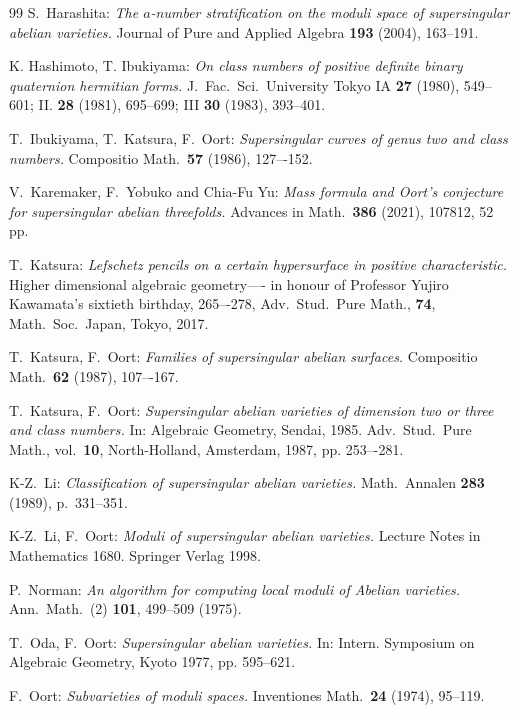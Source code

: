 \begin{thebibliography}{99}
 S.\ Harashita:
{\sl The $a$-number stratification on the moduli space of 
supersingular abelian varieties.} 
Journal of Pure and Applied Algebra \textbf{193} (2004), 163--191.

 K. Hashimoto, T. Ibukiyama: 
{\sl On class numbers of positive definite binary quaternion hermitian forms.} 
J.\ Fac.\ Sci.\ University Tokyo IA \textbf{27} (1980), 549--601; II. 
\textbf{28} (1981), 695--699; III \textbf{30} (1983), 393--401.

T.\ Ibukiyama, T.\ Katsura, F.\ Oort: 
{\sl Supersingular curves of genus two and class numbers.} 
Compositio Math.\ \textbf{57} (1986), 127–-152.

  V.\ Karemaker, F.\ Yobuko and Chia-Fu Yu: 
{\sl Mass formula and Oort's conjecture for supersingular abelian threefolds.} 
Advances in Math.\ \textbf{386}
(2021), 107812, 52 pp.

T.\ Katsura:
{\sl Lefschetz pencils on a certain hypersurface in positive characteristic.}
Higher dimensional algebraic geometry—-
in honour of Professor Yujiro Kawamata's
sixtieth birthday, 265–-278, Adv.\ Stud.\ Pure Math., \textbf{74}, 
Math.\ Soc.\ Japan, 
Tokyo, 2017.

 T.\ Katsura, F.\ Oort: 
{\sl Families of supersingular abelian surfaces.} 
Compositio Math.\ \textbf{62} (1987), 107–-167.

 T.\ Katsura, F.\ Oort: 
{\sl Supersingular abelian varieties of dimension two or three 
and class numbers.} 
In: Algebraic Geometry, Sendai, 1985. Adv.\ Stud.\ 
Pure Math., vol.\ \textbf{10}, North-Holland, Amsterdam,
1987, pp. 253–-281.



 K-Z.\ Li: 
{\sl Classification of supersingular abelian varieties.}
Math.\ Annalen \textbf{283} (1989), p.\ 331--351.

 K-Z.\ Li, F.\ Oort: 
{\sl Moduli of supersingular abelian varieties.}
Lecture Notes in Mathematics 1680. Springer Verlag 1998.


P.\ Norman:
{\sl An algorithm for computing local moduli of Abelian varieties.}
Ann.\ Math.\ (2) {\bf 101}, 499--509 (1975).

 T.\ Oda, F.\ Oort:
{\sl Supersingular abelian varieties.} 
In: Intern. Symposium on Algebraic Geometry, Kyoto 1977, pp. 595--621.

 F.\ Oort: {\sl Subvarieties of moduli spaces.} 
Inventiones Math.\ \textbf{24} (1974), 95--119.


\end{thebibliography}
